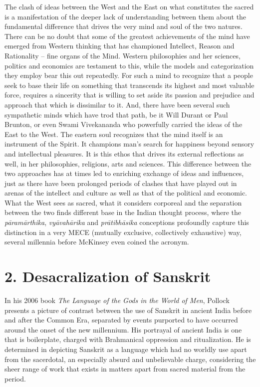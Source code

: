 The clash of ideas between the West and the East on what constitutes the sacred is a manifestation of the deeper lack of understanding between them about the fundamental difference that drives the very mind and soul of the two natures. There can be no doubt that some of the greatest achievements of the mind have emerged from Western thinking that has championed Intellect, Reason and Rationality – fine organs of the Mind. Western philosophies and her sciences, politics and economics are testament to this, while the models and categorization they employ bear this out repeatedly. For such a mind to recognize that a people seek to base their life on something that transcends its highest and most valuable force, requires a sincerity that is willing to set aside its passion and prejudice and approach that which is dissimilar to it. And, there have been several such sympathetic minds which have trod that path, be it Will Durant or Paul Brunton, or even Swami Vivekananda who powerfully carried the ideas of the East to the West. The eastern soul recognizes that the mind itself is an instrument of the Spirit. It champions man’s search for happiness beyond sensory and intellectual pleasures. It is this ethos that drives its external reflections as well, in her philosophies, religions, arts and sciences. This difference between the two approaches has at times led to enriching exchange of ideas and influences, just as there have been prolonged periods of clashes that have played out in arenas of the intellect and culture as well as that of the political and economic. What the West sees as sacred, what it considers corporeal and the separation between the two finds different base in the Indian thought process, where the \textit{pāramārthika}, \textit{vyāvahārika} and \textit{prātibhāsika} conceptions profoundly capture this distinction in a very MECE (mutually exclusive, collectively exhaustive) way, several millennia before McKinsey even coined the acronym.


\section*{2. Desacralization of Sanskrit}

In his 2006 book \textit{The Language of the Gods in the World of Men}, Pollock presents a picture of contrast between the use of Sanskrit in ancient India before and after the Common Era, separated by events purported to have occurred around the onset of the new millennium. His portrayal of ancient India is one that is boilerplate, charged with Brahmanical oppression and ritualization. He is determined in depicting Sanskrit as a language which had no worldly use apart from the sacerdotal, an especially absurd and unbelievable charge, considering the sheer range of work that exists in matters apart from sacred material from the period.

